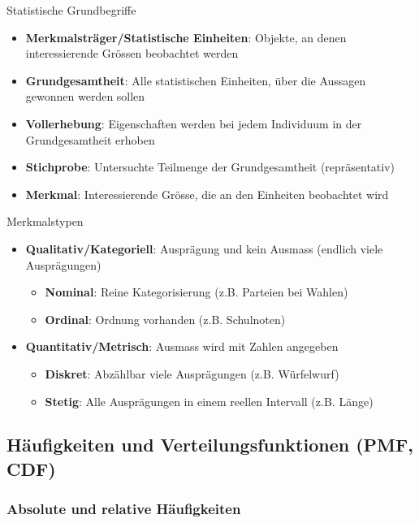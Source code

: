 \begin{definition}{Statistische Grundbegriffe}
\begin{itemize}
    \item \textbf{Merkmalsträger/Statistische Einheiten}: Objekte, an denen interessierende Grössen beobachtet werden
    \item \textbf{Grundgesamtheit}: Alle statistischen Einheiten, über die Aussagen gewonnen werden sollen
    \item \textbf{Vollerhebung}: Eigenschaften werden bei jedem Individuum in der Grundgesamtheit erhoben
    \item \textbf{Stichprobe}: Untersuchte Teilmenge der Grundgesamtheit (repräsentativ)
    \item \textbf{Merkmal}: Interessierende Grösse, die an den Einheiten beobachtet wird
\end{itemize}
\end{definition}

\begin{concept}{Merkmalstypen}
\begin{itemize}
    \item \textbf{Qualitativ/Kategoriell}: Ausprägung und kein Ausmass (endlich viele Ausprägungen)
    \begin{itemize}
        \item \textbf{Nominal}: Reine Kategorisierung (z.B. Parteien bei Wahlen)
        \item \textbf{Ordinal}: Ordnung vorhanden (z.B. Schulnoten)
    \end{itemize}
    \item \textbf{Quantitativ/Metrisch}: Ausmass wird mit Zahlen angegeben
    \begin{itemize}
        \item \textbf{Diskret}: Abzählbar viele Ausprägungen (z.B. Würfelwurf)
        \item \textbf{Stetig}: Alle Ausprägungen in einem reellen Intervall (z.B. Länge)
    \end{itemize}
\end{itemize}
\end{concept}




\subsection{Häufigkeiten und Verteilungsfunktionen (PMF, CDF)}

\subsubsection{Absolute und relative Häufigkeiten}

